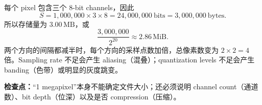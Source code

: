 \begin{workedsolution}
每个 pixel 包含三个 8-bit channels，因此
\[
  S=1{,}000{,}000\times3\times8
   =24{,}000{,}000\ \text{bits}
   =3{,}000{,}000\ \text{bytes}.
\]
所以存储量为 $3.00\,\mathrm{MB}$，或
\[
  \frac{3{,}000{,}000}{2^{20}}\approx2.86\,\mathrm{MiB}.
\]
两个方向的间隔都减半时，每个方向的采样点数加倍，总像素数变为 $2\times2=4$ 倍。Sampling rate 不足会产生 aliasing（混叠）；quantization levels 不足会产生 banding（色带）或明显的灰度跳变。
\end{workedsolution}

\textbf{检查点：}“1 megapixel”本身不能确定文件大小；还必须说明 channel count（通道数）、bit depth（位深）以及是否 compression（压缩）。
